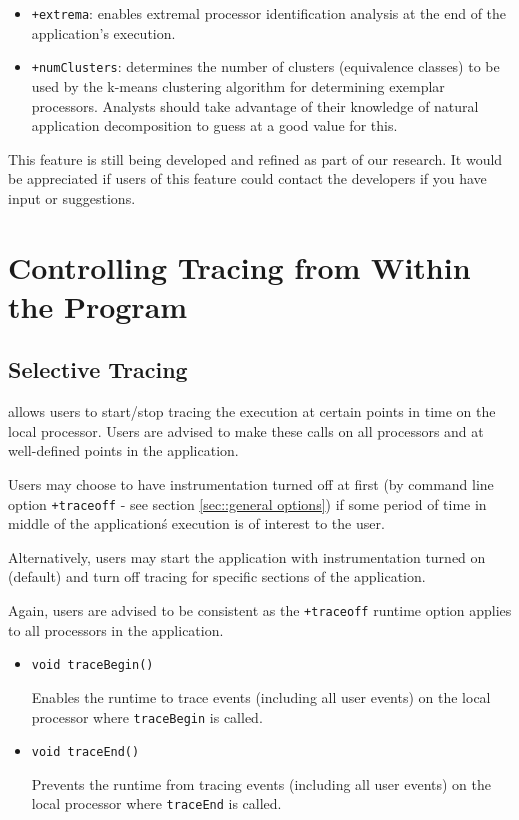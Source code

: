 \begin{itemize}
\item
{\tt +extrema}: enables extremal processor identification analysis at
the end of the application's execution.
\item
{\tt +numClusters}: determines the number of clusters (equivalence
classes) to be used by the k-means clustering algorithm for
determining exemplar processors. Analysts should take advantage of
their knowledge of natural application decomposition to guess at a
good value for this.
\end{itemize}

This feature is still being developed and refined as part of our
research. It would be appreciated if users of this feature could
contact the developers if you have input or suggestions.


\section{Controlling Tracing from Within the Program}
\label{sec::api}

\subsection{Selective Tracing}
\label{sec::selective tracing}

\charmpp{} allows users to start/stop tracing the execution at certain
points in time on the local processor. Users are advised to make these
calls on all processors and at well-defined points in the application.

Users may choose to have instrumentation turned off at first (by
command line option {\tt +traceoff} - see section \ref{sec::general options}) if some period of time in middle of the
application\'s execution is of interest to the user.

Alternatively, users may start the application with instrumentation
turned on (default) and turn off tracing for specific sections of the
application.

Again, users are advised to be consistent as the {\tt +traceoff}
runtime option applies to all processors in the application.

\begin{itemize}
\item
{\tt void traceBegin()}

Enables the runtime to trace events (including all user events) on the local processor where {\tt traceBegin} is called.

\item
{\tt void traceEnd()}

Prevents the runtime from tracing events (including all user events) on the local processor where {\tt traceEnd} is called.

\end{itemize}

